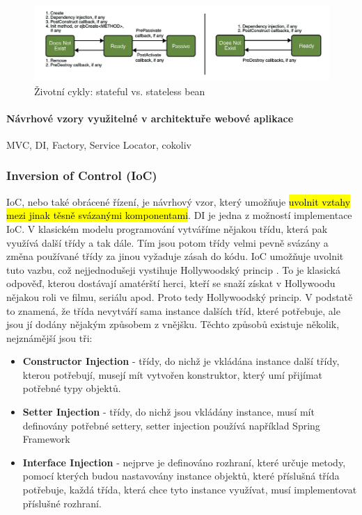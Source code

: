 \begin{figure}[h]
\centering
\includegraphics[width=140mm]{16/images/ejb-lifecycle}
\caption*{Životní cykly: stateful vs. stateless bean}
\end{figure}

\paragraph{Návrhové vzory využitelné v architektuře webové aplikace}
MVC, DI, Factory, Service Locator, cokoliv

\subsubsection{Inversion of Control (IoC)}
IoC, nebo také obrácené řízení, je návrhový vzor, který umožňuje \hl{uvolnit vztahy mezi jinak těsně svázanými komponentami}. DI je jedna z možností implementace IoC. V klasickém modelu programování vytváříme nějakou třídu, která pak využívá další třídy a tak dále. Tím jsou potom třídy velmi pevně svázány a změna používané třídy za jinou vyžaduje zásah do kódu. IoC umožňuje uvolnit tuto vazbu, což nejjednodušeji vystihuje Hollywoodský princip . To je klasická odpověď, kterou dostávají amatérští herci, kteří se snaží získat v Hollywoodu nějakou roli ve filmu, seriálu apod. Proto tedy Hollywoodský princip. V podstatě to znamená, že třída nevytváří sama instance dalších tříd, které potřebuje, ale jsou jí dodány nějakým způsobem z vnějšku. Těchto způsobů existuje několik, nejznámější jsou tři:
\begin{itemize}
\item \textbf{Constructor Injection} - třídy, do nichž je vkládána instance další třídy, kterou potřebují, musejí mít vytvořen konstruktor, který umí přijímat potřebné typy objektů.
\item \textbf{Setter Injection} - třídy, do nichž jsou vkládány instance, musí mít definovány potřebné settery, setter injection používá například Spring Framework
\item \textbf{Interface Injection} - nejprve je definováno rozhraní, které určuje metody, pomocí kterých budou nastavovány instance objektů, které příslušná třída potřebuje, každá třída, která chce tyto instance využívat, musí implementovat příslušné rozhraní.
\end{itemize}
